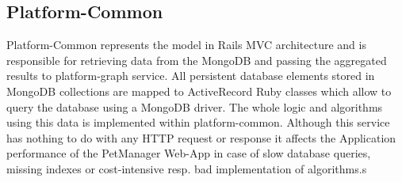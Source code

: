 \subsection{Platform-Common}
Platform-Common represents the model in Rails MVC architecture and is responsible for retrieving data from the MongoDB and passing the aggregated results to platform-graph service. All persistent database elements stored in MongoDB collections are mapped to ActiveRecord Ruby classes which allow to query the database using a MongoDB driver. The whole logic and algorithms using this data is implemented within platform-common. Although this service has nothing to do with any HTTP request or response it affects the Application performance of the PetManager Web-App in case of slow database queries, missing indexes or cost-intensive resp. bad implementation of algorithms.s
